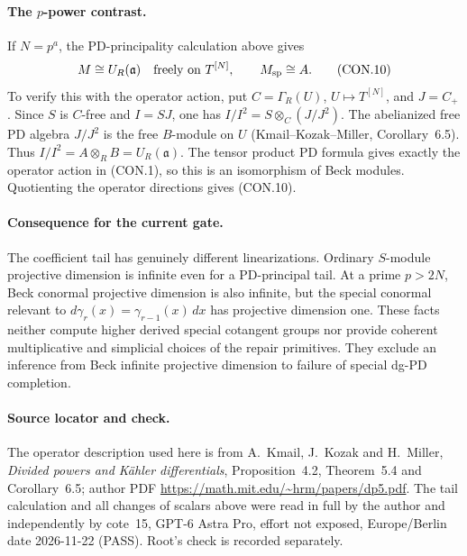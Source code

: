 \paragraph{The \(p\)-power contrast.}
If \(N=p^a\), the PD-principality calculation above gives
\[
 M\cong U_R(\mathfrak a)
 \quad\hbox{freely on }T^{[N]},\qquad
 M_{\mathrm{sp}}\cong A.
 \tag{CON.10}
\]
To verify this with the operator action, put
\(C=\Gamma_R(U)\), \(U\mapsto T^{[N]}\), and \(J=C_+\).
Since \(S\) is \(C\)-free and \(I=SJ\), one has
\(I/I^2=S\otimes_C(J/J^2)\).
The abelianized free PD algebra \(J/J^2\) is the free
\(B\)-module on \(U\) (Kmail--Kozak--Miller, Corollary~6.5).
Thus \(I/I^2=A\otimes_R B=U_R(\mathfrak a)\).
The tensor product PD formula gives exactly the operator action
in (CON.1), so this is an isomorphism of Beck modules. Quotienting
the operator directions gives (CON.10).

\paragraph{Consequence for the current gate.}
The coefficient tail has genuinely different linearizations.
Ordinary \(S\)-module projective dimension is infinite even for a
PD-principal tail. At a prime \(p>2N\), Beck conormal projective
dimension is also infinite, but the special conormal relevant to
\(d\gamma_r(x)=\gamma_{r-1}(x)\,dx\) has projective dimension one.
These facts neither compute higher derived special cotangent groups
nor provide coherent multiplicative and simplicial choices of the
repair primitives. They exclude an inference from Beck infinite
projective dimension to failure of special dg-PD completion.

\paragraph{Source locator and check.}
The operator description used here is from A.~Kmail, J.~Kozak and
H.~Miller, \emph{Divided powers and K\"ahler differentials},
Proposition~4.2, Theorem~5.4 and Corollary~6.5; author PDF
\url{https://math.mit.edu/~hrm/papers/dp5.pdf}.
The tail calculation and all changes of scalars above were read
in full by the author and independently by cote~15, GPT-6 Astra Pro,
effort not exposed, Europe/Berlin date 2026-11-22 (PASS).
Root's check is recorded separately.

